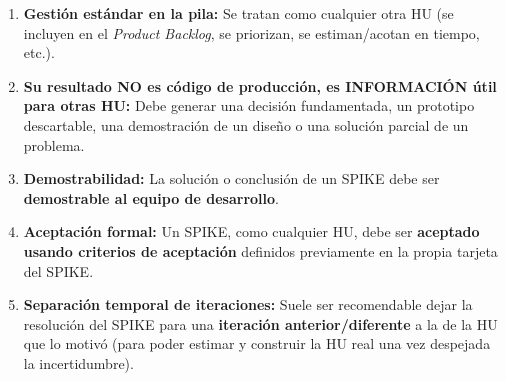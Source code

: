 \begin{aviso}
\begin{enumerate}[label=\textbf{Regla \arabic*:}, leftmargin=1.9cm, itemsep=3pt]
    \item \textbf{Gestión estándar en la pila:} Se tratan como cualquier otra HU (se incluyen en el \textit{Product Backlog}, se priorizan, se estiman/acotan en tiempo, etc.).
    \item \textbf{Su resultado NO es código de producción, es INFORMACIÓN útil para otras HU:} Debe generar una decisión fundamentada, un prototipo descartable, una demostración de un diseño o una solución parcial de un problema.
    \item \textbf{Demostrabilidad:} La solución o conclusión de un SPIKE debe ser \textbf{demostrable al equipo de desarrollo}.
    \item \textbf{Aceptación formal:} Un SPIKE, como cualquier HU, debe ser \textbf{aceptado usando criterios de aceptación} definidos previamente en la propia tarjeta del SPIKE.
    \item \textbf{Separación temporal de iteraciones:} Suele ser recomendable dejar la resolución del SPIKE para una \textbf{iteración anterior/diferente} a la de la HU que lo motivó (para poder estimar y construir la HU real una vez despejada la incertidumbre).
\end{enumerate}
\end{aviso}
